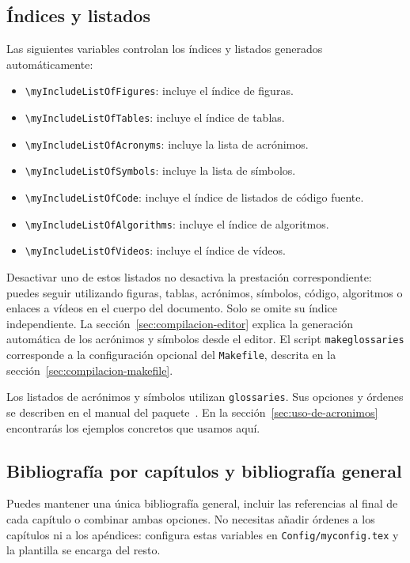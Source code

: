 \subsection{Índices y listados}

Las siguientes variables controlan los índices y listados generados automáticamente:

\begin{itemize}
  \item \texttt{\textbackslash{}myIncludeListOfFigures}: incluye el índice de figuras.
  \item \texttt{\textbackslash{}myIncludeListOfTables}: incluye el índice de tablas.
  \item \texttt{\textbackslash{}myIncludeListOfAcronyms}: incluye la lista de acrónimos.
  \item \texttt{\textbackslash{}myIncludeListOfSymbols}: incluye la lista de símbolos.
  \item \texttt{\textbackslash{}myIncludeListOfCode}: incluye el índice de listados de código fuente.
  \item \texttt{\textbackslash{}myIncludeListOfAlgorithms}: incluye el índice de algoritmos.
  \item \texttt{\textbackslash{}myIncludeListOfVideos}: incluye el índice de vídeos.
\end{itemize}

Desactivar uno de estos listados no desactiva la prestación correspondiente: puedes seguir utilizando figuras, tablas, acrónimos, símbolos, código, algoritmos o enlaces a vídeos en el cuerpo del documento. Solo se omite su índice independiente. La sección~\ref{sec:compilacion-editor} explica la generación automática de los acrónimos y símbolos desde el editor. El script \texttt{makeglossaries} corresponde a la configuración opcional del \texttt{Makefile}, descrita en la sección~\ref{sec:compilacion-makefile}.

Los listados de acrónimos y símbolos utilizan \texttt{glossaries}. Sus opciones y órdenes se describen en el manual del paquete~\cite{glossaries-manual}. En la sección~\ref{sec:uso-de-acronimos} encontrarás los ejemplos concretos que usamos aquí.

\subsection{Bibliografía por capítulos y bibliografía general}
\label{sec:bibliografias-capitulos}

Puedes mantener una única bibliografía general, incluir las referencias al final de cada capítulo o combinar ambas opciones. No necesitas añadir órdenes a los capítulos ni a los apéndices: configura estas variables en \texttt{Config/myconfig.tex} y la plantilla se encarga del resto.

